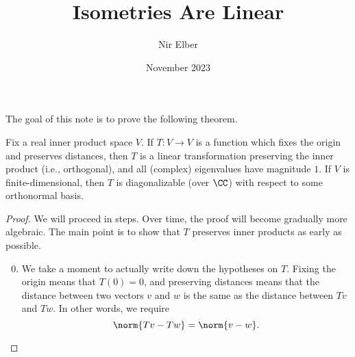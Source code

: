 \documentclass{article}
\title{Isometries Are Linear}
\author{Nir Elber}
\date{November 2023}
\begin{document}
\maketitle

The goal of this note is to prove the following theorem.
\begin{theorem}
    Fix a real inner product space $V$. If $T\colon V\to V$ is a function which fixes the origin and preserves distances, then $T$ is a linear transformation preserving the inner product (i.e., orthogonal), and all (complex) eigenvalues have magnitude $1$. If $V$ is finite-dimensional, then $T$ is diagonalizable (over $\CC$) with respect to some orthonormal basis.
\end{theorem}
\begin{proof}
    We will proceed in steps. Over time, the proof will become gradually more algebraic. The main point is to show that $T$ preserves inner products as early as possible.
    \begin{enumerate}
        \setcounter{enumi}{-1}
        \item We take a moment to actually write down the hypotheses on $T$. Fixing the origin means that $T(0)=0$, and preserving distances means that the distance between two vectors $v$ and $w$ is the same as the distance between $Tv$ and $Tw$. In other words, we require
        \[\norm{Tv-Tw}=\norm{v-w}.\]

        




\end{enumerate}
\end{proof}
\end{document}
